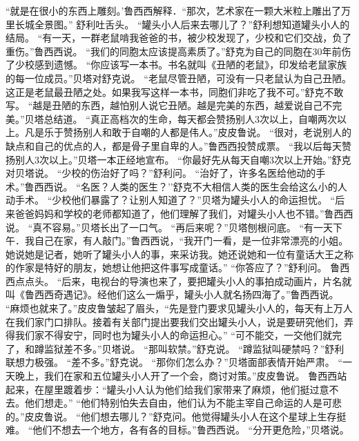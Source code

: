 \documentclass[a4paper,12pt,UTF8,twoside]{ctexbook}
\begin{document}
        “就是在很小的东西上雕刻。’鲁西西解释．“那次，艺术家在一颗大米粒上雕出了万里长城全景图。” 
        舒利吐舌头。 
        “罐头小人后来去哪儿了？”舒利想知道罐头小人的结局。 
        “有一天，一群老鼠啃我爸爸的书，被少校发现了，少校和它们交战，负了重伤。”鲁西西说。 
        “我们的同胞太应该提高素质了。”舒克为自己的同胞在30年前伤了少校感到遗憾。 
        “你应该写一本书。书名就叫《丑陋的老鼠》，印发给老鼠家族的每一位成员。”贝塔对舒克说。 
        “老鼠尽管丑陋，可没有一只老鼠认为自己丑陋。这正是老鼠最丑陋之处。如果我写这样一本书，同胞们非吃了我不可。”舒克不敢写。 
        “越是丑陋的东西，越怕别人说它丑陋。越是完美的东西，越爱说自己不完美。”贝塔总结道。 
        “真正高档次的生命，每天都会赞扬别人3次以上，自嘲两次以上。凡是乐于赞扬别人和敢于自嘲的人都是伟人。”皮皮鲁说。 
        “很对，老说别人的缺点和自己的优点的人，都是骨子里自卑的人。”鲁西西投赞成票。 
        “我以后每天赞扬别人3次以上。”贝塔一本正经地宣布。 
        “你最好先从每天自嘲3次以上开始。”舒克对贝塔说。 
        “少校的伤治好了吗？”舒利问。 
        “治好了，许多名医给他动的手术。”鲁西西说。 
        “名医？人类的医生？’’舒克不大相信人类的医生会给这么小的人动手术。 
        “少校他们暴露了？让别人知道了？”贝塔为罐头小人的命运担忧。 
        “后来爸爸妈妈和学校的老师都知道了，他们理解了我们，对罐头小人也不错。”鲁西西说。 
        “真不容易。”贝塔长出了一口气。 
        “再后来呢？”贝塔刨根问底。 
        “有一天下午．我自己在家，有人敲门。”鲁西西说，“我开门一看，是一位非常漂亮的小姐。她说她是记者，她听了罐头小人的事，来采访我。她还说她和一位有童话大王之称的作家是特好的朋友，她想让他把这件事写成童话。” 
        “你答应了？”舒利问。 
        鲁西西点点头。 
        “后来，电视台的导演也来了，要把罐头小人的事拍成动画片，片名就叫《鲁西西奇遇记》。经他们这么一煽乎，罐头小人就名扬四海了。”鲁西西说。 
        “麻烦也就来了。”皮皮鲁皱起了眉头，“先是登门要求见罐头小人的，每天有上万人在我们家门口排队。接着有关部门提出要我们交出罐头小人，说是要研究他们，弄得我们家不得安宁，同时也为罐头小人的命运担心。” 
        “可不能交，一交他们就完了，和蹲监狱差不多。”贝塔说。 
        “那叫软禁。”舒克说。 
        “蹲监狱叫硬禁吗？”舒利联想力极强。 
        “差不多。”舒克说。 
        “那你们怎么办？”贝塔面部表情开始严肃。 
        “一天晚上，我们在家和五位罐头小人开了一个会，商讨对策。”皮皮鲁说。 
        鲁西西站起来，在屋里踱着步：“罐头小人认为他们给我们家带来了麻烦，他们挺过意不去。他们想走。” 
        “他们特别怕失去自由，他们认为不能主宰自己命运的人是可悲的。”皮皮鲁说。 
        “他们想去哪儿？”舒克问。他觉得罐头小人在这个星球上生存挺难。 
        “他们不想去一个地方，各有各的目标。”鲁西西说。 
        “分开更危险，”贝塔说。 
\end{document}
